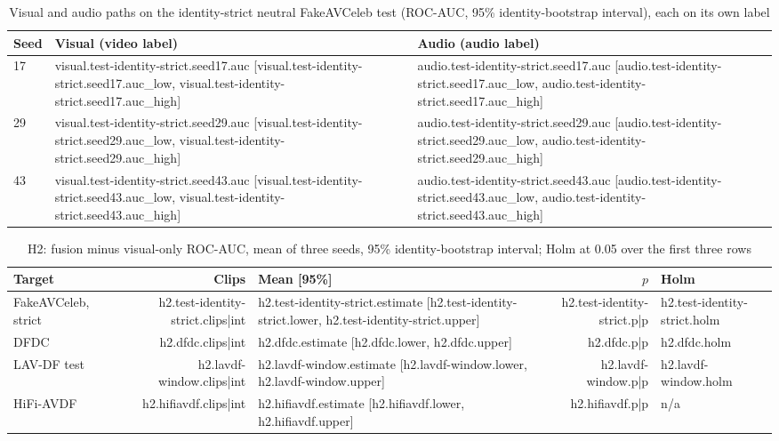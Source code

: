 \begin{table}[htbp]
    \centering
    \caption{Visual and audio paths on the identity-strict neutral FakeAVCeleb
    test (ROC-AUC, 95\% identity-bootstrap interval), each on its own label}
    \label{tab:branches}
    \begin{tabular}{lll}
        \toprule
        \textbf{Seed} & \textbf{Visual (video label)} & \textbf{Audio (audio label)} \\
        \midrule
        17 & {{visual.test-identity-strict.seed17.auc}} [{{visual.test-identity-strict.seed17.auc_low}}, {{visual.test-identity-strict.seed17.auc_high}}] & {{audio.test-identity-strict.seed17.auc}} [{{audio.test-identity-strict.seed17.auc_low}}, {{audio.test-identity-strict.seed17.auc_high}}] \\
        29 & {{visual.test-identity-strict.seed29.auc}} [{{visual.test-identity-strict.seed29.auc_low}}, {{visual.test-identity-strict.seed29.auc_high}}] & {{audio.test-identity-strict.seed29.auc}} [{{audio.test-identity-strict.seed29.auc_low}}, {{audio.test-identity-strict.seed29.auc_high}}] \\
        43 & {{visual.test-identity-strict.seed43.auc}} [{{visual.test-identity-strict.seed43.auc_low}}, {{visual.test-identity-strict.seed43.auc_high}}] & {{audio.test-identity-strict.seed43.auc}} [{{audio.test-identity-strict.seed43.auc_low}}, {{audio.test-identity-strict.seed43.auc_high}}] \\
        \bottomrule
    \end{tabular}
\end{table}

\begin{table}[htbp]
    \centering
    \caption{H2: fusion minus visual-only ROC-AUC, mean of three seeds, 95\%
    identity-bootstrap interval; Holm at 0.05 over the first three rows}
    \label{tab:h2}
    \begin{tabular}{lrlrl}
        \toprule
        \textbf{Target} & \textbf{Clips} & \textbf{Mean [95\%]} & \textbf{$p$} & \textbf{Holm} \\
        \midrule
        FakeAVCeleb, strict & {{h2.test-identity-strict.clips|int}} & {{h2.test-identity-strict.estimate}} [{{h2.test-identity-strict.lower}}, {{h2.test-identity-strict.upper}}] & {{h2.test-identity-strict.p|p}} & {{h2.test-identity-strict.holm}} \\
        DFDC & {{h2.dfdc.clips|int}} & {{h2.dfdc.estimate}} [{{h2.dfdc.lower}}, {{h2.dfdc.upper}}] & {{h2.dfdc.p|p}} & {{h2.dfdc.holm}} \\
        LAV-DF test & {{h2.lavdf-window.clips|int}} & {{h2.lavdf-window.estimate}} [{{h2.lavdf-window.lower}}, {{h2.lavdf-window.upper}}] & {{h2.lavdf-window.p|p}} & {{h2.lavdf-window.holm}} \\
        \midrule
        HiFi-AVDF & {{h2.hifiavdf.clips|int}} & {{h2.hifiavdf.estimate}} [{{h2.hifiavdf.lower}}, {{h2.hifiavdf.upper}}] & {{h2.hifiavdf.p|p}} & n/a \\
        \bottomrule
    \end{tabular}
\end{table}

